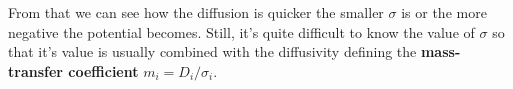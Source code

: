 From that we can see how the diffusion is quicker the smaller $\sigma$ is or the more negative the potential becomes. Still, it's quite difficult to know the value of $\sigma$ so that it's value is usually combined with the diffusivity defining the \textbf{mass-transfer coefficient} $m_i = D_i/\sigma_i$.